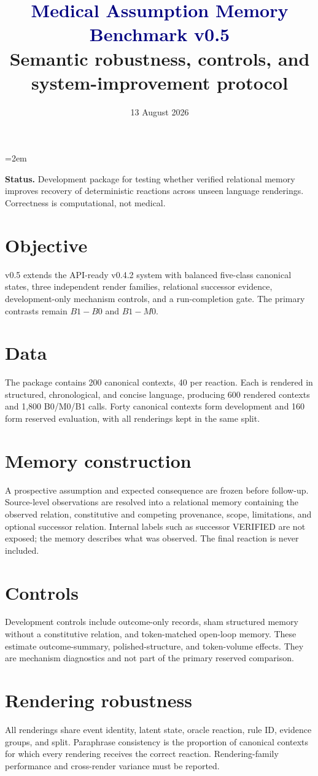 \documentclass[10.5pt]{article}\usepackage[margin=.85in]{geometry}\usepackage[T1]{fontenc}\usepackage{lmodern,microtype,booktabs,longtable,amsmath,xcolor,hyperref,fancyhdr}
\title{\vspace{-1cm}\textcolor{navy}{\Huge Medical Assumption Memory Benchmark v0.5}\\\Large Semantic robustness, controls, and system-improvement protocol}\date{13 August 2026}
\begin{document}
\sloppy\emergencystretch=2em\maketitle
\noindent\colorbox{pale}{\parbox{.96\linewidth}{\textbf{Status.} Development package for testing whether verified relational memory improves recovery of deterministic reactions across unseen language renderings. Correctness is computational, not medical.}}
\section{Objective}v0.5 extends the API-ready v0.4.2 system with balanced five-class canonical states, three independent render families, relational successor evidence, development-only mechanism controls, and a run-completion gate. The primary contrasts remain $B1-B0$ and $B1-M0$.
\section{Data}The package contains 200 canonical contexts, 40 per reaction. Each is rendered in structured, chronological, and concise language, producing 600 rendered contexts and 1,800 B0/M0/B1 calls. Forty canonical contexts form development and 160 form reserved evaluation, with all renderings kept in the same split.
\section{Memory construction}A prospective assumption and expected consequence are frozen before follow-up. Source-level observations are resolved into a relational memory containing the observed relation, constitutive and competing provenance, scope, limitations, and optional successor relation. Internal labels such as successor VERIFIED are not exposed; the memory describes what was observed. The final reaction is never included.
\section{Controls}Development controls include outcome-only records, sham structured memory without a constitutive relation, and token-matched open-loop memory. These estimate outcome-summary, polished-structure, and token-volume effects. They are mechanism diagnostics and not part of the primary reserved comparison.
\section{Rendering robustness}All renderings share event identity, latent state, oracle reaction, rule ID, evidence groups, and split. Paraphrase consistency is the proportion of canonical contexts for which every rendering receives the correct reaction. Rendering-family performance and cross-render variance must be reported.
\end{document}
